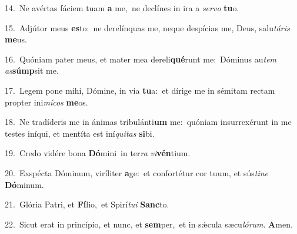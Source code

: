 {\numbfont\textcolor{\numbcolor}{14.}}~Ne avértas fáciem tuam \textbf{a} me,~\star ne declínes in ira a \textit{ser}\-\textit{vo} \textbf{tu}\-o.\par
{\numbfont\textcolor{\numbcolor}{15.}}~Adjútor meus \textbf{es}\-to:~\star ne derelínquas me, neque despícias me, Deus, salu\-\textit{tá}\-\textit{ris} \textbf{me}\-us.\par
{\numbfont\textcolor{\numbcolor}{16.}}~Quóniam pater meus, et mater mea dereli\-\textbf{qué}\-runt me:~\star Dóminus au\textit{tem} \textit{as}\-\textbf{súmp}sit me.\par
{\numbfont\textcolor{\numbcolor}{17.}}~Legem pone mihi, Dómine, in via \textbf{tu}\-a:~\star et dírige me in sémitam rectam propter ini\-\textit{mí}\-\textit{cos} \textbf{me}\-os.\par
{\numbfont\textcolor{\numbcolor}{18.}}~Ne tradíderis me in ánimas tribulánti\textbf{um} me:~\star quóniam insurrexérunt in me testes iníqui, et mentíta est iní\-\textit{qui}\-\textit{tas} \textbf{si}\-bi.\par
{\numbfont\textcolor{\numbcolor}{19.}}~Credo vidére bona \textbf{Dó}\-mini~\star in ter\textit{ra} \textit{vi}\-\textbf{vén}tium.\par
{\numbfont\textcolor{\numbcolor}{20.}}~Exspécta Dóminum, viríliter \textbf{a}\-ge:~\star et confortétur cor tuum, et sús\-\textit{ti}\-\textit{ne} \textbf{Dó}\-minum.\par
{\numbfont\textcolor{\numbcolor}{21.}}~Glória Patri, et \textbf{Fí}\-lio,~\star et Spirí\-\textit{tu}\-\textit{i} \textbf{Sanc}\-to.\par
{\numbfont\textcolor{\numbcolor}{22.}}~Sicut erat in princípio, et nunc, et \textbf{sem}\-per,~\star et in sǽcula sæcu\-\textit{ló}\-\textit{rum}. \textbf{A}\-men.\par
